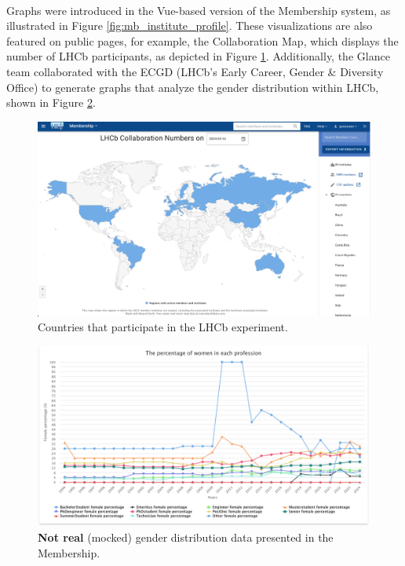 \paragraph{} Graphs were introduced in the Vue-based version of the Membership system, as illustrated in Figure \ref{fig:mb_institute_profile}. These visualizations are also featured on public pages, for example, the Collaboration Map, which displays the number of LHCb participants, as depicted in Figure \ref{fig:collaboration_map}. Additionally, the Glance team collaborated with the ECGD (LHCb's Early Career, Gender \& Diversity Office) to generate graphs that analyze the gender distribution within LHCb, shown in Figure \ref{fig:gender}.

\begin{figure} [H]
    \centering
    \includegraphics[width=1\linewidth]{figuras/collaboration_map.png}
    \caption{Countries that participate in the LHCb experiment.}
    \label{fig:collaboration_map}
\end{figure}


\begin{figure} [H]
    \centering
    \includegraphics[width=1\linewidth]{figuras/gender.png}
    \caption{\textbf{Not real} (mocked) gender distribution data presented in the Membership.}
    \label{fig:gender}
\end{figure}

